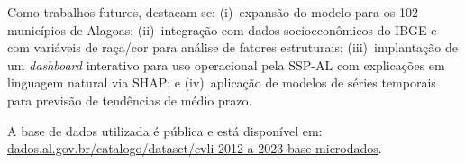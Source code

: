 \documentclass[12pt]{article}
\begin{document}
Como trabalhos futuros, destacam-se: (i)~expansão do modelo para os 102
municípios de Alagoas; (ii)~integração com dados socioeconômicos do IBGE e
com variáveis de raça/cor para análise de fatores estruturais; (iii)~implantação
de um \textit{dashboard} interativo para uso operacional pela SSP-AL com
explicações em linguagem natural via SHAP; e (iv)~aplicação de modelos de
séries temporais para previsão de tendências de médio prazo.

A base de dados utilizada é pública e está disponível em:
\url{dados.al.gov.br/catalogo/dataset/cvli-2012-a-2023-base-microdados}.



\end{document}

